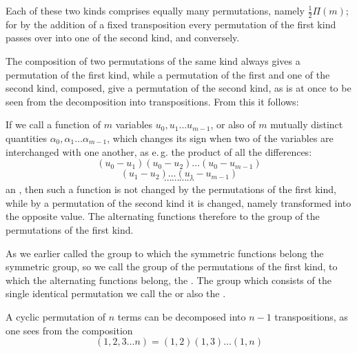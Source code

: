 

Each of these two kinds comprises equally many permutations, namely $\frac{1}{2}\Pi(m)$; for by the addition of a fixed transposition every permutation of the first kind passes over into one of the second kind, and conversely.

The composition of two permutations of the same kind always gives a permutation of the first kind, while a permutation of the first and one of the second kind, composed, give a permutation of the second kind, as is at once to be seen from the decomposition into transpositions. From this it follows:


If we call a function of $m$ variables $u_0, u_1 \dots u_{m-1}$, or also of $m$ mutually distinct quantities $\alpha_0, \alpha_1 \dots \alpha_{m-1}$, which changes its sign when two of the variables are interchanged with one another, as e.\,g. the product of all the differences:
\[
(u_0 - u_1)(u_0 - u_2) \dots (u_0 - u_{m-1})
\]
\[
(u_1 - u_2) \dots (u_1 - u_{m-1})
\]
\[
\cdots\cdots\cdots\cdots
\]
an , then such a function is not changed by the permutations of the first kind, while by a permutation of the second kind it is changed, namely transformed into the opposite value. The alternating functions therefore  to the group of the permutations of the first kind.

As we earlier called the group to which the symmetric functions belong the symmetric group, so we call the group of the permutations of the first kind, to which the alternating functions belong, the . The group which consists of the single identical permutation we call the  or also the .

A cyclic permutation of $n$ terms can be decomposed into $n - 1$ transpositions, as one sees from the composition
\[
(1, 2, 3 \dots n) = (1, 2)(1, 3) \dots (1, n)
\]
